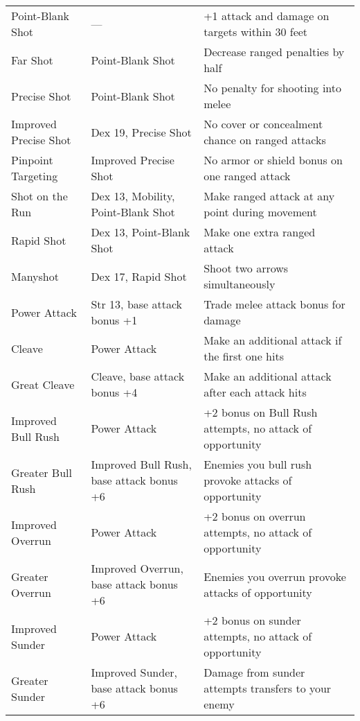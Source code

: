 \begin{table*}
  \sffamily
  \fontsize{9.5}{11.4}\selectfont

  \setlength{\tabcolsep}{1pt}
\begin{tabularx}{\linewidth}{lXl}
Point-Blank Shot & --- & +1 attack and damage on targets within 30 feet\\
\enspace Far Shot & Point-Blank Shot & Decrease ranged penalties by half\\
\enspace Precise Shot & Point-Blank Shot & No penalty for shooting into melee\\
\enspace \enspace Improved Precise Shot & Dex 19, Precise Shot & No cover or concealment chance on ranged attacks\\
\enspace  Pinpoint Targeting & Improved Precise Shot & No armor or shield bonus on one ranged attack\\
\enspace Shot on the Run & Dex 13, Mobility, Point-Blank Shot & Make ranged attack at any point during movement\\
\enspace Rapid Shot & Dex 13, Point-Blank Shot & Make one extra ranged attack\\
\enspace \enspace Manyshot & Dex 17, Rapid Shot & Shoot two arrows simultaneously\\
Power Attack & Str 13, base attack bonus +1 & Trade melee attack bonus for damage\\
\enspace Cleave & Power Attack & Make an additional attack if the first one hits\\
\enspace \enspace Great Cleave & Cleave, base attack bonus +4 & Make an additional attack after each attack hits\\
\enspace Improved Bull Rush & Power Attack & +2 bonus on Bull Rush attempts, no attack of opportunity\\
\enspace \enspace Greater Bull Rush & Improved Bull Rush, base attack bonus +6 & Enemies you bull rush provoke attacks of opportunity\\
\enspace Improved Overrun & Power Attack & +2 bonus on overrun attempts, no attack of opportunity\\
\enspace \enspace Greater Overrun & Improved Overrun, base attack bonus +6 & Enemies you overrun provoke attacks of opportunity \\
\enspace Improved Sunder & Power Attack & +2 bonus on sunder attempts, no attack of opportunity\\
\enspace \enspace Greater Sunder & Improved Sunder, base attack bonus +6 & Damage from sunder attempts transfers to your enemy\\

\end{tabularx}
\end{table*}
